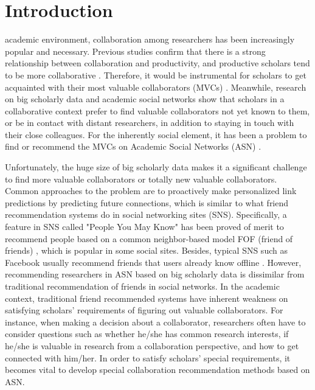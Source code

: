 \documentclass[10pt,journal,compsoc]{IEEEtran}
\begin{document}
\maketitle

\IEEEdisplaynotcompsoctitleabstractindextext
\IEEEpeerreviewmaketitle



\section{Introduction}
 academic environment, collaboration among researchers has been increasingly popular and necessary. Previous studies confirm that there is a strong relationship between collaboration and productivity, and productive scholars tend to be more collaborative \cite{Katz:what, Lee:impact}. Therefore, it would be instrumental for scholars to get acquainted with their most valuable collaborators (MVCs) \cite{Chen:CollabSeer}. Meanwhile, research on big scholarly data and academic social networks \cite{Tang:arnetminer, Tang:cross-domain} show that scholars in a collaborative context prefer to find valuable collaborators not yet known to them, or be in contact with distant researchers, in addition to staying in touch with their close colleagues. For the inherently social element, it has been a problem to find or recommend the MVCs on Academic Social Networks (ASN) \cite{lopes2010collaboration}.

Unfortunately, the huge size of big scholarly data makes it a significant challenge to find more valuable collaborators or totally new valuable collaborators. Common approaches to the problem are to proactively make personalized link predictions by predicting future connections, which is similar to what friend recommendation systems do in social networking sites (SNS). Specifically, a feature in SNS called "People You May Know" has been proved of merit to recommend people based on a common neighbor-based model FOF (friend of friends) \cite{Herlocker:analysis, Toscher:improved}, which is popular in some social sites. Besides, typical SNS such as Facebook usually recommend friends that users already know offline \cite{Boyd:social}. However, recommending researchers in ASN based on big scholarly data is dissimilar from traditional recommendation of friends in social networks. In the academic context, traditional friend recommended systems have inherent weakness on satisfying scholars' requirements of figuring out valuable collaborators. For instance, when making a decision about a collaborator, researchers often have to consider questions such as whether he/she has common research interests, if he/she is valuable in research from a collaboration perspective, and how to get connected with him/her. In order to satisfy scholars' special requirements, it becomes vital to develop special collaboration recommendation methods based on ASN.
\end{document}

